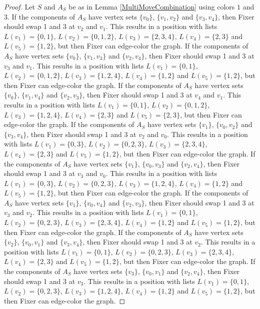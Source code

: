 \documentclass[12pt]{amsart}
\theoremstyle{plain}
\theoremstyle{definition}
\theoremstyle{remark}
\begin{document}
\begin{proof}
Let $S$ and $A_S$ be as in Lemma \ref{MultiMoveCombination} using colors $1$ and $3$. If the components of $A_S$ have vertex sets $\{v_0\}$, $\{v_1, v_2\}$ and $\{v_3, v_4\}$, then Fixer should swap 1 and 3 at $v_2$ and $v_1$. This results in a position with lists $L(v_1) = \{0, 1\}$, $L(v_2) = \{0, 1, 2\}$, $L(v_3) = \{2, 3, 4\}$, $L(v_4) = \{2, 3\}$ and $L(v_5) = \{1, 2\}$, but then Fixer can edge-color the graph.
If the components of $A_S$ have vertex sets $\{v_0\}$, $\{v_1, v_3\}$ and $\{v_2, v_4\}$, then Fixer should swap 1 and 3 at $v_3$ and $v_1$. This results in a position with lists $L(v_1) = \{0, 1\}$, $L(v_2) = \{0, 1, 2\}$, $L(v_3) = \{1, 2, 4\}$, $L(v_4) = \{1, 2\}$ and $L(v_5) = \{1, 2\}$, but then Fixer can edge-color the graph.
If the components of $A_S$ have vertex sets $\{v_0\}$, $\{v_1, v_4\}$ and $\{v_2, v_3\}$, then Fixer should swap 1 and 3 at $v_4$ and $v_1$. This results in a position with lists $L(v_1) = \{0, 1\}$, $L(v_2) = \{0, 1, 2\}$, $L(v_3) = \{1, 2, 4\}$, $L(v_4) = \{2, 3\}$ and $L(v_5) = \{2, 3\}$, but then Fixer can edge-color the graph.
If the components of $A_S$ have vertex sets $\{v_1\}$, $\{v_0, v_2\}$ and $\{v_3, v_4\}$, then Fixer should swap 1 and 3 at $v_2$ and $v_0$. This results in a position with lists $L(v_1) = \{0, 3\}$, $L(v_2) = \{0, 2, 3\}$, $L(v_3) = \{2, 3, 4\}$, $L(v_4) = \{2, 3\}$ and $L(v_5) = \{1, 2\}$, but then Fixer can edge-color the graph.
If the components of $A_S$ have vertex sets $\{v_1\}$, $\{v_0, v_3\}$ and $\{v_2, v_4\}$, then Fixer should swap 1 and 3 at $v_3$ and $v_0$. This results in a position with lists $L(v_1) = \{0, 3\}$, $L(v_2) = \{0, 2, 3\}$, $L(v_3) = \{1, 2, 4\}$, $L(v_4) = \{1, 2\}$ and $L(v_5) = \{1, 2\}$, but then Fixer can edge-color the graph.
If the components of $A_S$ have vertex sets $\{v_1\}$, $\{v_0, v_4\}$ and $\{v_2, v_3\}$, then Fixer should swap 1 and 3 at $v_3$ and $v_2$. This results in a position with lists $L(v_1) = \{0, 1\}$, $L(v_2) = \{0, 2, 3\}$, $L(v_3) = \{2, 3, 4\}$, $L(v_4) = \{1, 2\}$ and $L(v_5) = \{1, 2\}$, but then Fixer can edge-color the graph.
If the components of $A_S$ have vertex sets $\{v_2\}$, $\{v_0, v_1\}$ and $\{v_3, v_4\}$, then Fixer should swap 1 and 3 at $v_2$. This results in a position with lists $L(v_1) = \{0, 1\}$, $L(v_2) = \{0, 2, 3\}$, $L(v_3) = \{2, 3, 4\}$, $L(v_4) = \{2, 3\}$ and $L(v_5) = \{1, 2\}$, but then Fixer can edge-color the graph.
If the components of $A_S$ have vertex sets $\{v_3\}$, $\{v_0, v_1\}$ and $\{v_2, v_4\}$, then Fixer should swap 1 and 3 at $v_3$. This results in a position with lists $L(v_1) = \{0, 1\}$, $L(v_2) = \{0, 2, 3\}$, $L(v_3) = \{1, 2, 4\}$, $L(v_4) = \{1, 2\}$ and $L(v_5) = \{1, 2\}$, but then Fixer can edge-color the graph.

\end{proof}
\end{document}
